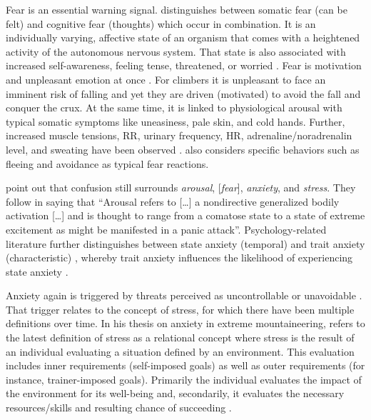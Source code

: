Fear is an essential warning signal. \textcite{Martens1987} distinguishes between somatic fear (can be felt) and cognitive fear (thoughts) which occur in combination. It is an individually varying, affective state of an organism that comes with a heightened activity of the autonomous nervous system. That state is also associated with increased self-awareness, feeling tense, threatened, or worried \autocites{Breckner2013}[based on][]{Krohne1996}. Fear is motivation and unpleasant emotion at once \autocites{Breckner2013}[based on][]{Woodman2001a,Hackfort1985}. For climbers it is unpleasant to face an imminent risk of falling and yet they are driven (motivated) to avoid the fall and conquer the crux. At the same time, it is linked to physiological arousal \autocite{Landers2001,Landers1980} with typical somatic symptoms like uneasiness, pale skin, and cold hands. Further, increased muscle tensions, \gls{RR}, urinary frequency, \gls{HR}, adrenaline/noradrenalin level, and sweating have been observed \autocite{Brand2010}. \textcite[148]{Rethorst2006} also considers specific behaviors such as fleeing and avoidance as typical fear reactions.

\textcite{Pijpers2005} point out that confusion still surrounds \textit{arousal}, [\textit{fear}], \textit{anxiety}, and \textit{stress}. They follow \textcite{Landers2001} in saying that “Arousal refers to [\dots{}] a nondirective generalized bodily activation [\dots{}] and is thought to range from a comatose state to a state of extreme excitement as might be manifested in a panic attack”. Psychology-related literature further distinguishes between state anxiety (temporal) and trait anxiety (characteristic) \autocite{Hackfort1985}, whereby trait anxiety influences the likelihood of experiencing state anxiety \autocite{Krohne2010}.


Anxiety again is triggered by threats perceived as uncontrollable or unavoidable \autocites[307]{Lewis2010}[78]{Schwenkmezger1989}. That trigger relates to the concept of stress, for which there have been multiple definitions over time. In his thesis on anxiety in extreme mountaineering, \textcite{Breckner2013} refers to the latest definition of stress as a relational concept \autocites{Krohne2010}[based on][]{lazarus1966psychological} where stress is the result of an individual evaluating a situation defined by an environment. This evaluation includes inner requirements (self-imposed goals) as well as outer requirements (for instance, trainer-imposed goals). Primarily the individual evaluates the impact of the environment for its well-being and, secondarily, it evaluates the necessary resources/skills and resulting chance of succeeding \autocite[based on][\pno~150]{Rethorst2006}.

